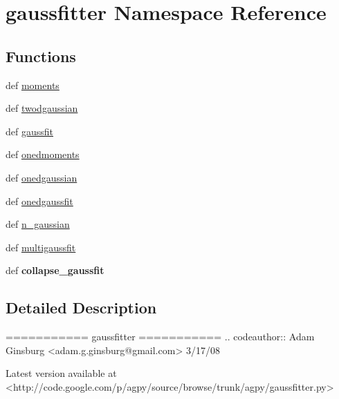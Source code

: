 \hypertarget{namespacegaussfitter}{\section{gaussfitter Namespace Reference}
\label{namespacegaussfitter}
}
\subsection*{Functions}
\begin{DoxyCompactItemize}
\item 
def \hyperlink{namespacegaussfitter_abd1c2194b2b4e46cf45ddfad70b03ceb}{moments}
\item 
def \hyperlink{namespacegaussfitter_a5ecea45513967b2a9673f8d484b1659c}{twodgaussian}
\item 
def \hyperlink{namespacegaussfitter_a216f1dc4453e3f52cbb62651be3d53c4}{gaussfit}
\item 
def \hyperlink{namespacegaussfitter_a0105f3835732be908715a64b0d103175}{onedmoments}
\item 
def \hyperlink{namespacegaussfitter_ae1b5c20c3b0c0dd91a2546de6234f4f3}{onedgaussian}
\item 
def \hyperlink{namespacegaussfitter_a1f9aea874228a76d5cb959c0a6cb777f}{onedgaussfit}
\item 
def \hyperlink{namespacegaussfitter_a7ccbf085e35174083d4761487269b4cb}{n\-\_\-gaussian}
\item 
def \hyperlink{namespacegaussfitter_a016a73df3118713791355e1368b0a932}{multigaussfit}
\item 
\hypertarget{namespacegaussfitter_a90a54f5036afe56b9a3b0d0de0eb52fb}{def {\bfseries collapse\-\_\-gaussfit}}\label{namespacegaussfitter_a90a54f5036afe56b9a3b0d0de0eb52fb}

\end{DoxyCompactItemize}


\subsection{Detailed Description}
\begin{DoxyVerb}===========
gaussfitter
===========
.. codeauthor:: Adam Ginsburg <adam.g.ginsburg@gmail.com> 3/17/08

Latest version available at <http://code.google.com/p/agpy/source/browse/trunk/agpy/gaussfitter.py>\end{DoxyVerb}
 

